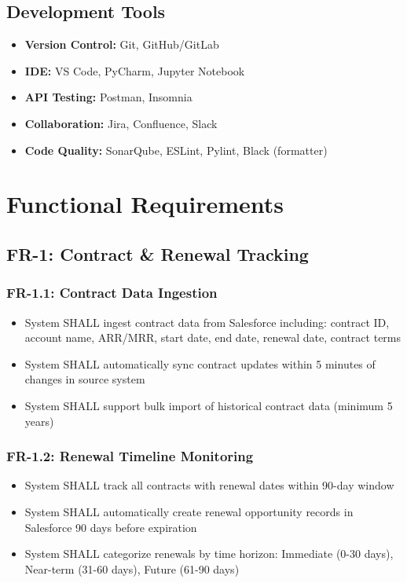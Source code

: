 \documentclass[12pt,a4paper]{article}
\begin{document}
\subsection{Development Tools}
\begin{itemize}
    \item \textbf{Version Control:} Git, GitHub/GitLab
    \item \textbf{IDE:} VS Code, PyCharm, Jupyter Notebook
    \item \textbf{API Testing:} Postman, Insomnia
    \item \textbf{Collaboration:} Jira, Confluence, Slack
    \item \textbf{Code Quality:} SonarQube, ESLint, Pylint, Black (formatter)
\end{itemize}

\section{Functional Requirements}

\subsection{FR-1: Contract \& Renewal Tracking}
\subsubsection{FR-1.1: Contract Data Ingestion}
\begin{itemize}
    \item System SHALL ingest contract data from Salesforce including: contract ID, account name, ARR/MRR, start date, end date, renewal date, contract terms
    \item System SHALL automatically sync contract updates within 5 minutes of changes in source system
    \item System SHALL support bulk import of historical contract data (minimum 5 years)
\end{itemize}
\subsubsection{FR-1.2: Renewal Timeline Monitoring}
\begin{itemize}
    \item System SHALL track all contracts with renewal dates within 90-day window
    \item System SHALL automatically create renewal opportunity records in Salesforce 90 days before expiration
    \item System SHALL categorize renewals by time horizon: Immediate (0-30 days), Near-term (31-60 days), Future (61-90 days)
\end{itemize}
\end{document}
